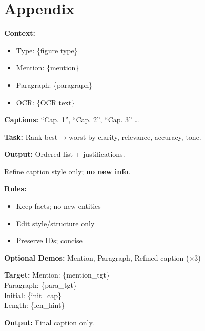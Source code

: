\documentclass{article} %
\begin{document}
\clearpage
\appendix
\section{Appendix}
\begin{table}[ht]
\centering
\renewcommand{\arraystretch}{0.95}

\begin{minipage}[t]{0.47\textwidth}
\begin{tcolorbox}[
  enhanced,
  colback=gray!8,
  colframe=black!60,
  fontupper=\scriptsize,
  title=\footnotesize Caption Ranking Prompt,
  boxsep=0.6pt,
  left=2pt,right=2pt,top=2pt,bottom=2pt,
  width=\textwidth
]
\scriptsize
\textbf{Context:}
\begin{itemize}[leftmargin=1em]
  \item Type: \{figure type\}
  \item Mention: \{mention\}
  \item Paragraph: \{paragraph\}
  \item OCR: \{OCR text\}
\end{itemize}

\textbf{Captions:} ``Cap. 1'', ``Cap. 2'', ``Cap. 3'' …

\textbf{Task:} Rank best$\to$worst by clarity, relevance, accuracy, tone.

\textbf{Output:} Ordered list + justifications.
\end{tcolorbox}
\end{minipage}
\hfill
\begin{minipage}[t]{0.47\textwidth}
\begin{tcolorbox}[
  enhanced,
  colback=gray!8,
  colframe=black!60,
  fontupper=\scriptsize,
  title=\footnotesize Caption Refinement Prompt,
  boxsep=0.6pt,
  left=2pt,right=2pt,top=2pt,bottom=2pt,
  width=\textwidth
]
\scriptsize
Refine caption style only; \textbf{no new info}.  

\textbf{Rules:}
\begin{itemize}[leftmargin=1em]
  \item Keep facts; no new entities
  \item Edit style/structure only
  \item Preserve IDs; concise
\end{itemize}

\textbf{Optional Demos:} Mention, Paragraph, Refined caption (×3)

\textbf{Target:}  
Mention: \{mention\_tgt\} \\
Paragraph: \{para\_tgt\} \\
Initial: \{init\_cap\} \\
Length: \{len\_hint\}  

\textbf{Output:} Final caption only.
\end{tcolorbox}
\end{minipage}

\caption{Prompt templates: (A) ranking and (B) refinement.}
\label{fig:caption-ranking-side}
\end{table}
\end{document}
